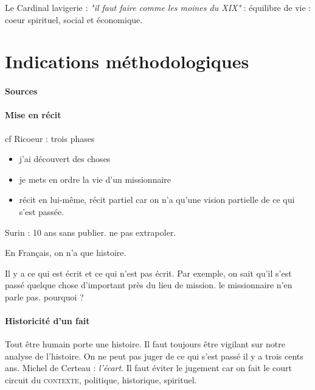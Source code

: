 Le Cardinal  lavigerie : \textit{"il faut faire comme les moines du XIX" }: équilibre de vie : coeur spirituel, social et économique. 


\section{Indications méthodologiques}

\paragraph{Sources}
\paragraph{Mise en récit} cf Ricoeur : trois phases 
\begin{itemize}
\item j'ai découvert des choses
\item je mets en ordre la vie d'un missionnaire
\item récit en lui-même, récit partiel car on n'a qu'une vision partielle de ce qui s'est passée.
\end{itemize}

\begin{Ex}
Surin : 10 ans sans publier. ne pas extrapoler.
\end{Ex} 

\begin{Def}
En Français, on n'a que histoire.
\end{Def}

Il y a ce qui est écrit et ce qui n'est pas écrit. Par exemple, on sait qu'il s'est passé quelque chose d'important près du lieu de mission. le missionnaire n'en parle pas. pourquoi ?

\paragraph{Historicité d'un fait}
Tout être humain porte une histoire. Il faut toujours être vigilant sur notre analyse de l'histoire. On ne peut pas juger de ce qui s'est passé il y a trois cents ans. Michel de Certeau : \textit{l'écart}. Il faut éviter le jugement car on fait le court circuit du \textsc{contexte}, politique, historique, spirituel.

